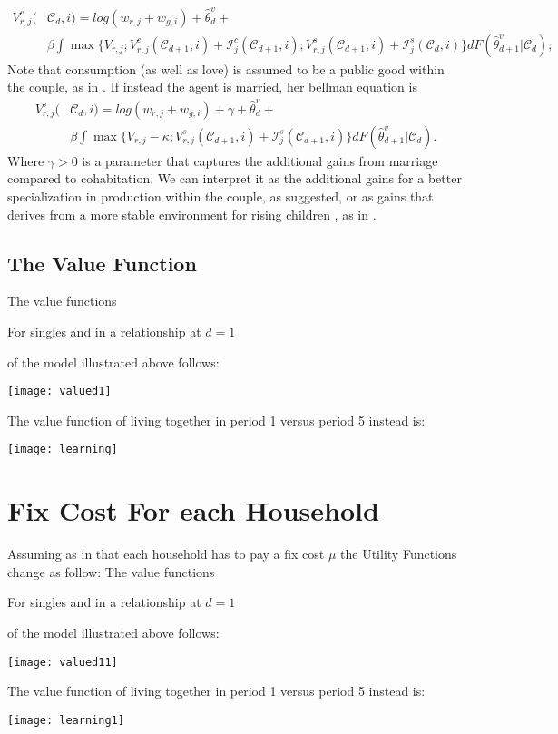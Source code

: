 \documentclass[12pt]{article}
\begin{document}
 \begin{equation}\label{eq:vco}
 \begin{split}
 V_{r,j}^{c}(&\mathcal{C}_d,i)=log(w_{r,j}+w_{g,i})+\hat{\theta}_{d}^v+\\& \beta\int\max\bigg\{V_{r,j};V^{c}_{r,j}(\mathcal{C}_{d+1},i)+\mathcal{I}_j^c(\mathcal{C}_{d+1},i);V^{s}_{r,j}(\mathcal{C}_{d+1},i)+\mathcal{I}_j^s(\mathcal{C}_d,i)\bigg\} dF(\hat{\theta}_{d+1}^v|\mathcal{C}_{d});
 \end{split}
 \end{equation}
 Note that consumption (as well as love) is assumed to be a public good within the couple, as in \citet{greenwood2016technology}.
 If instead the agent is married, her bellman equation is
 \begin{equation}\label{eq:vsp}
  \begin{split}
 V_{r,j}^{s}(&\mathcal{C}_d,i)=log(w_{r,j}+w_{g,i})+\gamma+\hat{\theta}_{d}^v+\\& \beta\int\max\bigg\{V_{r,j}-\kappa;V^{s}_{r,j}(\mathcal{C}_{d+1},i)+\mathcal{I}_j^s(\mathcal{C}_{d+1},i)\bigg\} dF(\hat{\theta}_{d+1}^v|\mathcal{C}_{d}).
   \end{split}
 \end{equation}
 Where $\gamma>0$ is a parameter that captures the additional gains from marriage compared to cohabitation. We can interpret it as the additional gains for a better specialization in production within the couple, as \citet{gemici2014} suggested, or as gains that derives from a more stable environment for rising children , as in \citet{lundberg2016}.
 \subsection{The Value Function}
 The value functions\begin{footnote}{For singles and in a relationship at $d=1$} \end{footnote} of the model illustrated above follows:
\begin{center}
\texttt{[image: valued1]}
\end{center}
\newpage
The value function of living together in period 1 versus period 5 instead is:
\begin{center}
	\texttt{[image: learning]}
\end{center}
 \section{Fix Cost For each Household}
 Assuming as in \cite{greenwood2016technology} that each household has to pay a fix cost $\mu$ the Utility Functions change as follow:
  The value functions\begin{footnote}{For singles and in a relationship at $d=1$} \end{footnote} of the model illustrated above follows:
  \begin{center}
  	\texttt{[image: valued11]}
  \end{center}
  \newpage
  The value function of living together in period 1 versus period 5 instead is:
  \begin{center}
  	\texttt{[image: learning1]}
  \end{center}
\end{document}
